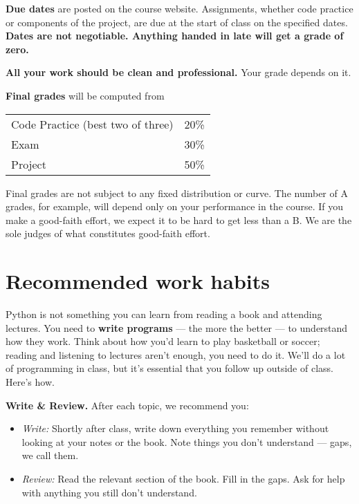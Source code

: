 \documentclass[11pt]{article}
\begin{document}
{\bf Due dates} are posted on the course website.
Assignments, whether code practice or components of the project,
are due at the start of class on the specified dates.
{\bf Dates are not negotiable.
Anything handed in late will get a grade of zero.\/}

{\bf All your work should be clean and professional.}  Your grade depends on it.


{\bf Final grades\/} will be computed from
\begin{center}
\begin{tabular}{ll}
Code Practice (best two of three) & 20\% \\
Exam        & 30\% \\
Project     & 50\% \\
\end{tabular}
\end{center}
Final grades are not subject to any fixed distribution or curve.
The number of A grades, for example,
will depend only on your performance in the course.
If you make a good-faith effort,
we expect it to be hard to get less than a B.
We are the sole judges of what constitutes good-faith effort.


\section*{Recommended work habits}

Python is not something you can learn from reading a book and attending lectures.
You need to {\bf write programs\/} ---
the more the better --- to understand how they work.
Think about how you'd learn to play basketball or soccer;
reading and listening to lectures aren't enough, you need to do it.
We'll do a lot of programming in class, but it's {essential\/} that you
follow up outside of class.
Here's how.


{\bf Write \& Review.\/}
After each topic, we recommend you:
%
\begin{itemize}
\item {\it Write:\/}  Shortly after class, write down everything you remember
without looking at your notes or the book.
Note things you don't understand --- gaps, we call them.
\item {\it Review:\/} Read the relevant section of the book.  Fill in the gaps.
Ask for help with anything you still don't understand.
\end{itemize}
%
\end{document}
